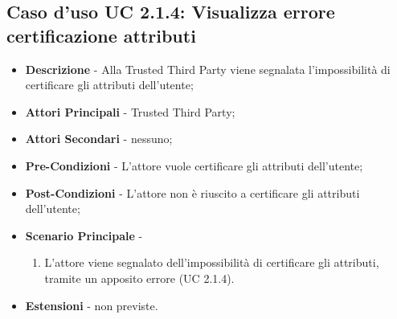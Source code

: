 \subsection{Caso d'uso UC 2.1.4: Visualizza errore certificazione attributi}
\begin{itemize}
	\item \textbf{Descrizione} - Alla Trusted Third Party viene segnalata l'impossibilità di certificare gli attributi dell'utente;
	\item \textbf{Attori Principali} - Trusted Third Party;
	\item \textbf{Attori Secondari} - nessuno;
	\item \textbf{Pre-Condizioni} - L'attore vuole certificare gli attributi dell'utente;
	\item \textbf{Post-Condizioni} - L'attore non è riuscito a certificare gli attributi dell'utente;
	\item \textbf{Scenario Principale} - 
	\begin{enumerate}
		\item L'attore viene segnalato dell'impossibilità di certificare gli attributi, tramite un apposito errore (UC 2.1.4).
	\end{enumerate}
	\item \textbf{Estensioni} - non previste.
\end{itemize}

